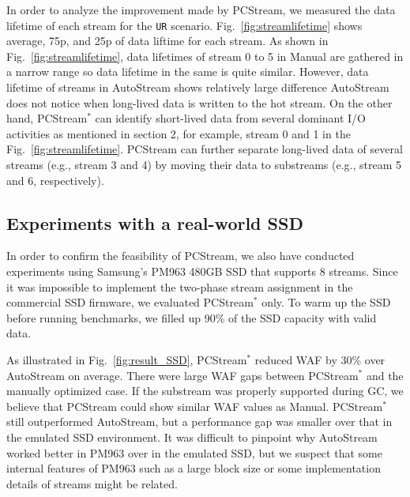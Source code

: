In order to analyze the improvement made by {\sf PCStream}, 
we measured the data lifetime of each stream for the {\tt UR} scenario.
Fig.~\ref{fig:streamlifetime} shows average, 75p, and 25p of data liftime 
for each stream.
As shown in Fig.~\ref{fig:streamlifetime}, data lifetimes of stream 0 to 5
in \textsf{Manual} are gathered in a narrow range so data lifetime in
the same is quite similar.
However, data lifetime of streams in \textsf{AutoStream} shows relatively large difference
\textsf{AutoStream} does not notice when long-lived data is written to
the hot stream.
On the other hand, {\sf PCStream$^*$} can identify short-lived data from 
several dominant I/O activities as mentioned 
in section 2, for example, stream 0 and 1 in the Fig.~\ref{fig:streamlifetime}.
\textsf{PCStream} can further separate long-lived data of several streams 
(e.g., stream 3 and 4)
by moving their data to substreams (e.g., stream 5 and 6, respectively). 

\vspace{-10pt}
\subsection{Experiments with a real-world SSD}


In order to confirm the feasibility of \textsf{PCStream}, we also have
conducted experiments using Samsung's PM963 480GB SSD that supports 8 streams.
Since it was impossible to implement the two-phase stream assignment in the
commercial SSD firmware, we evaluated {\sf PCStream$^*$} only.  To warm up the
SSD before running benchmarks, we filled up 90\% of the SSD capacity with valid
data.

As illustrated in Fig.~\ref{fig:result_SSD}, {\sf PCStream$^*$} reduced WAF by
30\% over \textsf{AutoStream} on average.  There were large WAF gaps between
\textsf{PCStream$^{*}$} and the manually optimized case.  If the substream was
properly supported during GC, we believe that \textsf{PCStream} could show
similar WAF values as \textsf{Manual}.  \textsf{PCStream$^*$} still
outperformed \textsf{AutoStream}, but a performance gap was smaller over that
in the emulated SSD environment.  It was difficult to pinpoint why
\textsf{AutoStream} worked better in PM963 over in the emulated SSD, but we
suspect that some internal features of PM963 such as a large block size or some
implementation details of streams might be related. 

